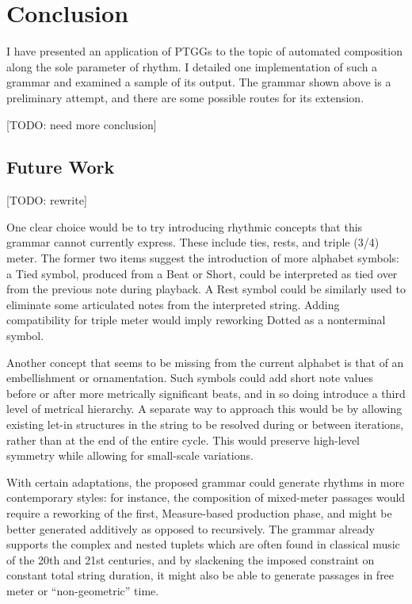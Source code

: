 \documentclass{article}
\begin{document}

\section{Conclusion}

I have presented an application of PTGGs to the topic of automated composition along the sole parameter of rhythm. I detailed one implementation of such a grammar and examined a sample of its output. The grammar shown above is a preliminary attempt, and there are some possible routes for its extension. 

[TODO: need more conclusion]

\subsection{Future Work}

[TODO: rewrite]

One clear choice would be to try introducing rhythmic concepts that this grammar cannot currently express. These include ties, rests, and triple (3/4) meter. The former two items suggest the introduction of more alphabet symbols: a Tied symbol, produced from a Beat or Short, could be interpreted as tied over from the previous note during playback. A Rest symbol could be similarly used to eliminate some articulated notes from the interpreted string. Adding compatibility for triple meter would imply reworking Dotted as a nonterminal symbol.

Another concept that seems to be missing from the current alphabet is that of an embellishment or ornamentation. Such symbols could add short note values before or after more metrically significant beats, and in so doing introduce a third level of metrical hierarchy. A separate way to approach this would be by allowing existing let-in structures in the string to be resolved during or between iterations, rather than at the end of the entire cycle. This would preserve high-level symmetry while allowing for small-scale variations.

With certain adaptations, the proposed grammar could generate rhythms in more contemporary styles: for instance, the composition of mixed-meter passages would require a reworking of the first, Measure-based production phase, and might be better generated additively as opposed to recursively. The grammar already supports the complex and nested tuplets which are often found in classical music of the 20th and 21st centuries, and by slackening the imposed constraint on constant total string duration, it might also be able to generate passages in free meter or “non-geometric” time.
\end{document}
